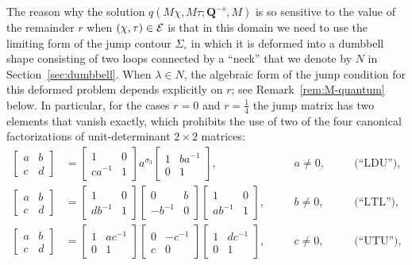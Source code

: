 The reason why the solution $q(M\chi,M\tau;\mathbf{Q}^{-s},M)$ is so sensitive to the value of the remainder $r$ when $(\chi,\tau)\in\mathcal{E}$ is that in this domain we need to use the limiting form of the jump contour $\Sigma_\circ$ in which it is deformed into a dumbbell shape consisting of two loops connected by a ``neck'' that we denote by $N$ in Section~\ref{sec:dumbbell}.  When $\lambda\in N$, the algebraic form of the jump condition for this deformed problem depends explicitly on $r$; see Remark~\ref{rem:M-quantum} below.  In particular, for the cases $r=0$ and $r=\tfrac{1}{4}$ the jump matrix has two elements that vanish exactly, which prohibits the use of two of the four canonical factorizations of unit-determinant $2\times 2$ matrices:
\begin{equation}
\begin{alignedat}{3}
\begin{bmatrix} a&b\\c&d\end{bmatrix}&=\begin{bmatrix}1 & 0\\ca^{-1} & 1\end{bmatrix}a^{\sigma_3}\begin{bmatrix}1 & ba^{-1}\\0 & 1\end{bmatrix},&&\quad a\neq 0, &&\quad\text{(``LDU'')},\\
\begin{bmatrix} a&b\\c&d\end{bmatrix}&=\begin{bmatrix}1 & 0\\db^{-1}&1\end{bmatrix}\begin{bmatrix}0&b\\-b^{-1} & 0\end{bmatrix}\begin{bmatrix}1&0\\ab^{-1}&1\end{bmatrix},&&\quad b\neq 0,&&\quad\text{(``LTL'')},\\
\begin{bmatrix} a&b\\c&d\end{bmatrix}&=\begin{bmatrix}1 & ac^{-1}\\0 & 1\end{bmatrix}
\begin{bmatrix}0 & -c^{-1}\\c & 0\end{bmatrix}\begin{bmatrix}1 & dc^{-1}\\0 & 1\end{bmatrix},&&\quad c\neq 0,&&\quad\text{(``UTU'')},\\

\end{alignedat}
\end{equation}
